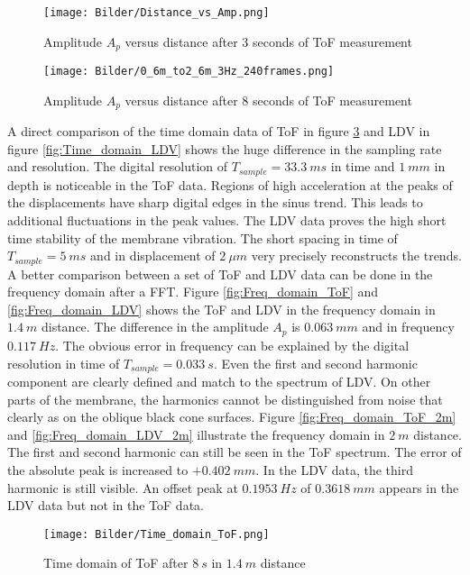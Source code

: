 \begin{figure}[!h]  
	\centering
	\texttt{[image: Bilder/Distance\_vs\_Amp.png]}
	\caption{Amplitude $A_p$ versus distance after 3 seconds of ToF measurement}
	\label{fig:Distance_vs_Amp}
\end{figure} 

\begin{figure}[!h]  
	\centering
	\texttt{[image: Bilder/0\_6m\_to2\_6m\_3Hz\_240frames.png]}
	\caption{Amplitude $A_p$ versus distance after 8 seconds of ToF measurement}
	\label{fig:0_6m_to2_6m_3Hz_240frames}
\end{figure} 

A direct comparison of the time domain data of ToF in figure \ref{fig:Time_domain_ToF} and LDV in figure \ref{fig:Time_domain_LDV} shows the huge difference in the sampling rate and resolution. The digital resolution of $T_{sample} = 33.3~ms$ in time and $1~mm$ in depth is noticeable in the ToF data. Regions of high acceleration at the peaks of the displacements have sharp digital edges in the sinus trend. This leads to additional fluctuations in the peak values. The LDV data proves the high short time stability of the membrane vibration. The short spacing in time of $T_{sample} = 5~ms$ and in displacement of $2~\mu m$ very precisely reconstructs the trends. A better comparison between a set of ToF and LDV data can be done in the frequency domain after a FFT. Figure \ref{fig:Freq_domain_ToF} and \ref{fig:Freq_domain_LDV} shows the ToF and LDV in the frequency domain in $1.4~m$ distance. The difference in the amplitude $A_p$ is $0.063~mm$ and in frequency $0.117~Hz$. The obvious error in frequency can be explained by the digital resolution in time of $T_{sample}=0.033~s$. Even the first and second harmonic component are clearly defined and match to the spectrum of LDV. On other parts of the membrane, the harmonics cannot be distinguished from noise that clearly as on the oblique black cone surfaces. Figure \ref{fig:Freq_domain_ToF_2m}  and \ref{fig:Freq_domain_LDV_2m} illustrate the frequency domain in $2~m$ distance. The first and second harmonic can still be seen in the ToF spectrum. The error of the absolute peak is increased to $+0.402~mm$. In the LDV data, the third harmonic is still visible. An offset peak at $0.1953~Hz$ of $0.3618~mm$ appears in the LDV data but not in the ToF data. 

\begin{figure}[!h]  
	\centering
	\texttt{[image: Bilder/Time\_domain\_ToF.png]}
	\caption{Time domain of ToF after $8~s$ in $1.4~m$ distance}
	\label{fig:Time_domain_ToF}
\end{figure}  

